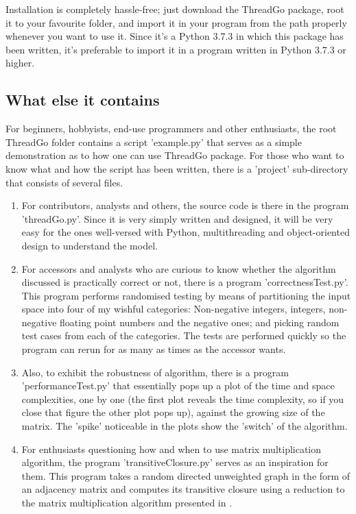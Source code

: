\documentclass{article}
\begin{document}
Installation is completely hassle-free; just download the ThreadGo package, root it to your favourite folder, and import it in your program from the path properly whenever you want to use it. Since it's a Python 3.7.3 in which this package has been written, it's preferable to import it in a program written in Python 3.7.3 or higher.

\subsection{What else it contains}

For beginners, hobbyists, end-use programmers and other enthusiasts, the root ThreadGo folder contains a script 'example.py' that serves as a simple demonstration as to how one can use ThreadGo package. For those who want to know what and how the script has been written, there is a 'project' sub-directory that consists of several files.

\begin{enumerate}
	\item For contributors, analysts and others, the source code is there in the program 'threadGo.py'. Since it is very simply written and designed, it will be very easy for the ones well-versed with Python, multithreading and object-oriented design to understand the model.
	\item For accessors and analysts who are curious to know whether the algorithm discussed is practically correct or not, there is a program 'correctnessTest.py'. This program performs randomised testing by means of partitioning the input space into four of my wishful categories: Non-negative integers, integers, non-negative floating point numbers and the negative ones; and picking random test cases from each of the categories. The tests are performed quickly so the program can rerun for as many as times as the accessor wants.
	\item Also, to exhibit the robustness of algorithm, there is a program 'performanceTest.py' that essentially pops up a plot of the time and space complexities, one by one (the first plot reveals the time complexity, so if you close that figure the other plot pops up), against the growing size of the matrix. The 'spike' noticeable in the plots show the 'switch' of the algorithm.
	\item For enthusiasts questioning how and when to use matrix multiplication algorithm, the program 'transitiveClosure.py' serves as an inspiration for them. This program takes a random directed unweighted graph in the form of an adjacency matrix and computes its transitive closure using a reduction to the matrix multiplication  algorithm presented in \cite{skeina}.
\end{enumerate}
\end{document}
